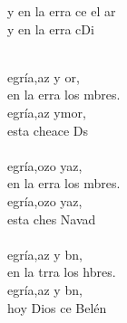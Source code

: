 \begin{cancion}%
	\begin{chorus}%
	y en la erra ce el ar\\
	y en la erra cDi\\
	\end{chorus}%
	\jump\\
	egría,az y or, \\
	en la erra los mbres.\\
	egría,az ymor, \\
	esta cheace Ds\\
	\jump\\
	egría,ozo yaz,\\
	en la erra los mbres.\\
	egría,ozo yaz,\\
	esta ches Navad\\
	\jump\\
	egría,az y bn, \\
	en la trra los hbres.\\
	egría,az y bn,\\
	hoy Dios ce  Belén\\
\end{cancion}%
